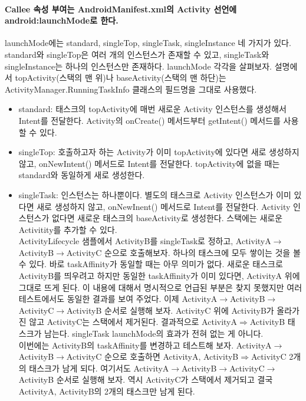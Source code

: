 \paragraph{Callee 속성 부여는 AndroidManifest.xml의 Activity 선언에 android:launchMode로 한다.}
launchMode에는 standard, singleTop, singleTask, singleInstance 네 가지가 있다. standard와 singleTop은 여러 개의 인스턴스가 존재할 수 있고, singleTask와 singleInstance는 하나의 인스턴스만 존재하다. launchMode 각각을 살펴보자. 설명에서 topActivity(스택의 맨 위)나 baseActivity(스택의 맨 하단)는  ActivityManager.RunningTaskInfo 클래스의 필드명을 그대로 사용했다.
\begin{itemize}
\item standard: 태스크의 topActivity에 매번 새로운 Activity 인스턴스를 생성해서 Intent를 전달한다. Activity의 onCreate() 메서드부터 getIntent() 메서드를 사용할 수 있다.
\item singleTop: 호출하고자 하는 Activity가 이미 topActivity에 있다면 새로 생성하지 않고, onNewIntent() 메서드로 Intent를 전달한다. topActivity에 없을 때는 standard와 동일하게 새로 생성한다.
\item singleTask: 인스턴스는 하나뿐이다. 별도의 태스크로 Activity 인스턴스가 이미 있다면 새로 생성하지 않고, onNewInent() 메서드로 Intent를 전달한다. 
Activity 인스턴스가 없다면 새로운 태스크의 baseActivity로 생성한다. 스택에는 새로운 Activitity를 추가할 수 있다.\\

ActivityLifecycle 샘플에서 ActivityB를 singleTask로 정하고, ActivityA$\rightarrow$ActivityB$\rightarrow$ActivityC 순으로 호출해보자. 하나의 태스크에 모두 쌓이는 것을 볼 수 있다. 바로 taskAffinity가 동일할 때는 아무 의미가 없다. 새로운 태스크로 ActivityB를 띄우려고 하지만 동일한 taskAffinity가 이미 있다면,  ActivityA 위에 그대로 뜨게 된다. 이 내용에 대해서 명시적으로 언급된 부분은 찾지 못했지만 여러 테스트에서도 동일한 결과를 보여 주었다. 이제 ActivityA$\rightarrow$ActivityB$\rightarrow$ActivityC$\rightarrow$ActivityB 순서로 실행해 보자. ActivityC 위에 ActivityB가 올라가진 않고 ActivityC는 스택에서 제거된다. 결과적으로 ActivityA$\Rightarrow$ActivityB 태스크가 남는다. singleTask launchMode의 효과가 전혀 없는 게 아니다.\\

이번에는 ActivityB의 taskAffinity를 변경하고 테스트해 보자. ActivityA$\rightarrow$ActivityB$\rightarrow$ActivityC 순으로 호출하면 ActivityA, ActivityB$\Rightarrow$ActivityC 2개의 태스크가 남게 되다. 
여기서도 ActivityA$\rightarrow$Activi\-tyB$\rightarrow$ActivityC$\rightarrow$ActivityB 순서로 실행해 보자. 역시 ActivityC가 스택에서 제거되고 결국 ActivityA, ActivityB의 2개의 태스크만 남게 된다.\\


\end{itemize}

